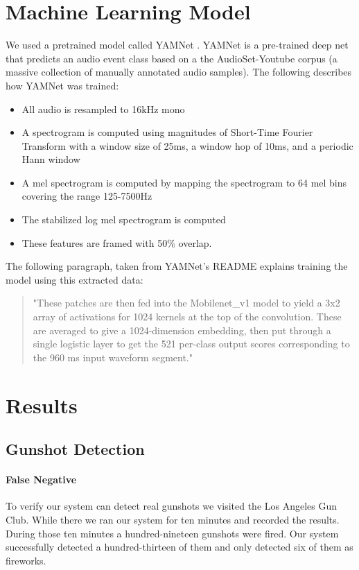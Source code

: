 \documentclass[conference]{IEEEtran}
\begin{document}
\section{Machine Learning Model}
We used a pretrained model called YAMNet  \cite{b6}. YAMNet is a pre-trained deep net that predicts an audio event class based on a the AudioSet-Youtube corpus (a massive collection of manually annotated audio samples). The following describes how YAMNet was trained: 
\begin{itemize}
    \item All audio is resampled to 16kHz mono
    \item A spectrogram is computed using magnitudes of Short-Time Fourier Transform with a window size of 25ms, a window hop of 10ms, and a periodic Hann window
    \item A mel spectrogram is computed by mapping the spectrogram to 64 mel bins covering the range 125-7500Hz
    \item The stabilized log mel spectrogram is computed 
  \item These features are framed with 50\% overlap. 
\end{itemize}
The following paragraph, taken from YAMNet’s README explains training the model using this extracted data:
\begin{quote}
"These patches are then fed into the Mobilenet\_v1 model to yield a 3x2 array of activations for 1024 kernels at the top of the convolution. These are averaged to give a 1024-dimension embedding, then put through a single logistic layer to get the 521 per-class output scores corresponding to the 960 ms input waveform segment." 

\end{quote}


\section{Results}


\subsection{Gunshot Detection}



\paragraph{False Negative}To verify our system can detect real gunshots we visited the Los Angeles Gun Club. While there we ran our system for ten minutes and recorded the results. During those ten minutes a hundred-nineteen gunshots were fired. Our system successfully detected a hundred-thirteen of them and only detected six of them as fireworks.
\end{document}

